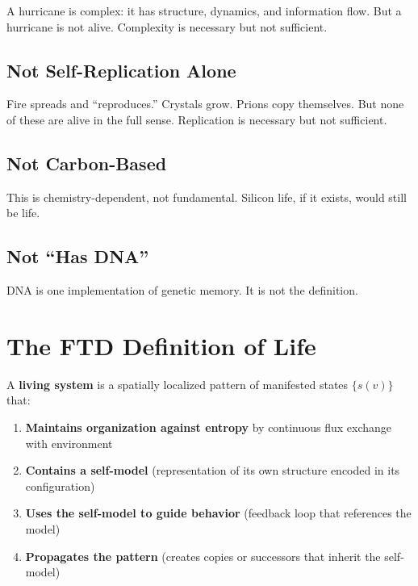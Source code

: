 \documentclass[
  11pt,
  letterpaper,
  twoside,
  openright]{book}
\providecommand{\tightlist}{%
  \setlength{\itemsep}{0pt}\setlength{\parskip}{0pt}}
\begin{document}
A hurricane is complex: it has structure, dynamics, and information
flow. But a hurricane is not alive. Complexity is necessary but not
sufficient.

\subsection{Not Self-Replication
Alone}\label{not-self-replication-alone}

Fire spreads and ``reproduces.'' Crystals grow. Prions copy themselves.
But none of these are alive in the full sense. Replication is necessary
but not sufficient.

\subsection{Not Carbon-Based}\label{not-carbon-based}

This is chemistry-dependent, not fundamental. Silicon life, if it
exists, would still be life.

\subsection{Not ``Has DNA''}\label{not-has-dna}

DNA is one implementation of genetic memory. It is not the definition.

\section{The FTD Definition of Life}\label{the-ftd-definition-of-life}

\begin{tcolorbox}[enhanced jigsaw, coltitle=black, colbacktitle=quarto-callout-important-color!10!white, toprule=.15mm, colframe=quarto-callout-important-color-frame, arc=.35mm, opacityback=0, bottomtitle=1mm, toptitle=1mm, breakable, colback=white, titlerule=0mm, opacitybacktitle=0.6, title=\textcolor{quarto-callout-important-color}{\faExclamation}\hspace{0.5em}{Definition: Life}, rightrule=.15mm, bottomrule=.15mm, leftrule=.75mm, left=2mm]

A \textbf{living system} is a spatially localized pattern of manifested
states \(\{s(v)\}\) that:

\begin{enumerate}
\def\labelenumi{\arabic{enumi}.}
\tightlist
\item
  \textbf{Maintains organization against entropy} by continuous flux
  exchange with environment
\item
  \textbf{Contains a self-model} (representation of its own structure
  encoded in its configuration)
\item
  \textbf{Uses the self-model to guide behavior} (feedback loop that
  references the model)
\item
  \textbf{Propagates the pattern} (creates copies or successors that
  inherit the self-model)
\end{enumerate}

\end{tcolorbox}
\end{document}
